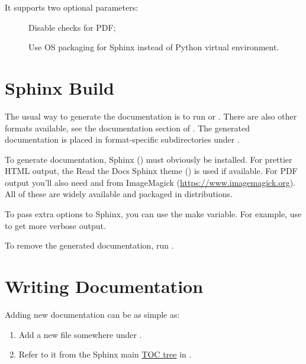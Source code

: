 \documentclass[a4paper,8pt,english]{sphinxmanual}
\begin{document}
It supports two optional parameters:
\begin{description}
\item[{}] \leavevmode
Disable checks for PDF;

\item[{}] \leavevmode
Use OS packaging for Sphinx instead of Python virtual environment.

\end{description}


\chapter{Sphinx Build}
\label{doc-guide/sphinx:sphinx-build}
The usual way to generate the documentation is to run  or
. There are also other formats available, see the documentation
section of . The generated documentation is placed in
format-specific subdirectories under .

To generate documentation, Sphinx () must obviously be
installed. For prettier HTML output, the Read the Docs Sphinx theme
() is used if available. For PDF output you'll also need
 and  from ImageMagick (\href{https://www.imagemagick.org}{https://www.imagemagick.org}).
All of these are widely available and packaged in distributions.

To pass extra options to Sphinx, you can use the  make
variable. For example, use  to get more verbose
output.

To remove the generated documentation, run .


\chapter{Writing Documentation}
\label{doc-guide/sphinx:writing-documentation}
Adding new documentation can be as simple as:
\begin{enumerate}
\item {} 
Add a new  file somewhere under .

\item {} 
Refer to it from the Sphinx main \href{http://www.sphinx-doc.org/en/stable/markup/toctree.html}{TOC tree} in .

\end{enumerate}
\end{document}
